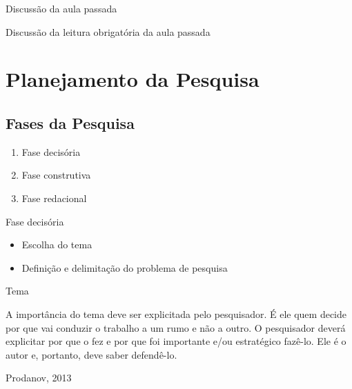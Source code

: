 \documentclass{beamer}
\begin{document}

\begin{frame}{Discussão da aula passada}
  \begin{block}{}
    Discussão da leitura obrigatória da aula passada
  \end{block}
\end{frame}

\section{Planejamento da Pesquisa}

\subsection{Fases da Pesquisa}

\begin{frame}
  \begin{enumerate}
  \item Fase decisória
    \bigskip
  \item Fase construtiva
    \bigskip
  \item Fase redacional
  \end{enumerate}
\end{frame}

\begin{frame}{Fase decisória}
  \begin{itemize}
  \item Escolha do tema
    \bigskip
  \item Definição e delimitação do problema de pesquisa
  \end{itemize}
\end{frame}

\begin{frame}{Tema}
  \begin{block}{}
    \footnotesize
    A importância do tema deve ser explicitada pelo pesquisador. É ele
    quem decide por que vai conduzir o trabalho a um rumo e não a
    outro. O pesquisador deverá explicitar por que o fez e por que foi
    importante e/ou estratégico fazê-lo. Ele é o autor e, portanto,
    deve saber defendê-lo.
  \end{block}

  \vfill
  \scriptsize
  \hfill Prodanov, 2013
\end{frame}
\end{document}
